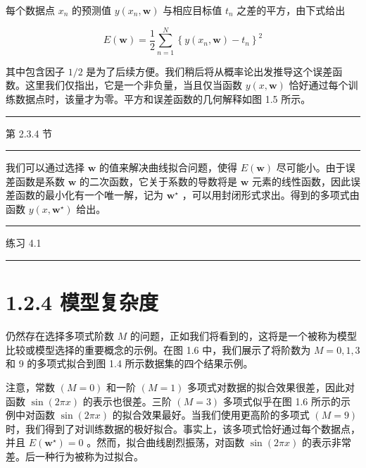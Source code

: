 \documentclass[10pt]{article}
\newcommand{\HRule}{\begin{center}\rule{0.9\linewidth}{0.2mm}\end{center}}
\begin{document}
每个数据点 \({x}_{n}\) 的预测值 \(y\left( {{x}_{n},\mathbf{w}}\right)\) 与相应目标值 \({t}_{n}\) 之差的平方，由下式给出

\[
E\left( \mathbf{w}\right)  = \frac{1}{2}\mathop{\sum }\limits_{{n = 1}}^{N}{\left\{  y\left( {x}_{n},\mathbf{w}\right)  - {t}_{n}\right\}  }^{2} \tag{1.2}
\]

其中包含因子 \(1/2\) 是为了后续方便。我们稍后将从概率论出发推导这个误差函数。这里我们仅指出，它是一个非负量，当且仅当函数 \(y\left( {x,\mathbf{w}}\right)\) 恰好通过每个训练数据点时，该量才为零。平方和误差函数的几何解释如图 1.5 所示。

\HRule

第 2.3.4 节

\HRule

我们可以通过选择 \(\mathbf{w}\) 的值来解决曲线拟合问题，使得 \(E\left( \mathbf{w}\right)\) 尽可能小。由于误差函数是系数 \(\mathbf{w}\) 的二次函数，它关于系数的导数将是 \(\mathbf{w}\) 元素的线性函数，因此误差函数的最小化有一个唯一解，记为 \({\mathbf{w}}^{ \star  }\) ，可以用封闭形式求出。得到的多项式由函数 \(y\left( {x,{\mathbf{w}}^{ \star  }}\right)\) 给出。

\HRule

练习 4.1

\HRule

\section*{1.2.4 模型复杂度}

仍然存在选择多项式阶数 \(M\) 的问题，正如我们将看到的，这将是一个被称为模型比较或模型选择的重要概念的示例。在图 1.6 中，我们展示了将阶数为 \(M = 0,1,3\) 和 9 的多项式拟合到图 1.4 所示数据集的四个结果示例。

注意，常数 \(\left( {M = 0}\right)\) 和一阶 \(\left( {M = 1}\right)\) 多项式对数据的拟合效果很差，因此对函数 \(\sin \left( {2\pi x}\right)\) 的表示也很差。三阶 \(\left( {M = 3}\right)\) 多项式似乎在图 1.6 所示的示例中对函数 \(\sin \left( {2\pi x}\right)\) 的拟合效果最好。当我们使用更高阶的多项式 \(\left( {M = 9}\right)\) 时，我们得到了对训练数据的极好拟合。事实上，该多项式恰好通过每个数据点，并且 \(E\left( {\mathbf{w}}^{ \star  }\right)  = 0\) 。然而，拟合曲线剧烈振荡，对函数 \(\sin \left( {2\pi x}\right)\) 的表示非常差。后一种行为被称为过拟合。
\end{document}
